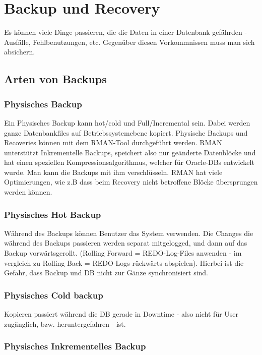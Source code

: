 \chapter{Backup und Recovery}\label{cha:backup}

Es können viele Dinge passieren, die die Daten in einer Datenbank gefährden - Ausfälle, Fehlbenutzungen, etc. Gegenüber diesen Vorkommnissen muss man sich absichern.

\section{Arten von Backups}

\subsection{Physisches Backup}

Ein Physisches Backup kann hot/cold und Full/Incremental sein.
Dabei werden ganze Datenbankfiles auf Betriebssystemebene kopiert.
Physische Backups und Recoveries können mit dem RMAN-Tool durchgeführt werden.
RMAN unterstützt Inkrementelle Backups, speichert also nur geänderte Datenblöcke und hat einen speziellen Kompressionsalgorithmus, welcher für Oracle-DBs entwickelt wurde.
Man kann die Backups mit ihm verschlüsseln. RMAN hat viele Optimierungen, wie z.B dass beim Recovery nicht betroffene Blöcke übersprungen werden können.

\subsection{Physisches Hot Backup}

Während des Backups können Benutzer das System verwenden. Die Changes die während des Backups passieren werden separat mitgelogged, und dann auf das Backup vorwärtsgerollt. (Rolling Forward = REDO-Log-Files anwenden - im vergleich zu Rolling Back = REDO-Logs rückwärts abspielen). Hierbei ist die Gefahr, dass Backup und DB nicht zur Gänze synchronisiert sind.

\subsection{Physisches Cold backup}

Kopieren passiert während die DB gerade in Downtime - also nicht für User zugänglich, bzw. heruntergefahren - ist.

\subsection{Physisches Inkrementelles Backup}

